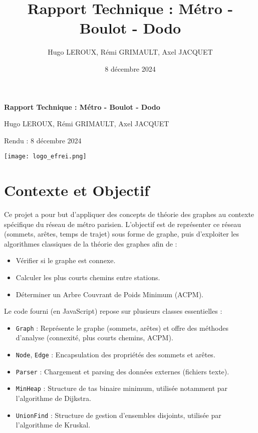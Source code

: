 \documentclass[a4paper,12pt]{article}
\title{Rapport Technique : Métro - Boulot - Dodo}
\author{Hugo LEROUX, Rémi GRIMAULT, Axel JACQUET}
\date{8 décembre 2024}
\begin{document}
\begin{titlepage}
    \thispagestyle{empty} %
    \begin{center}
        \vspace*{\fill}
        {\huge \bfseries Rapport Technique : Métro - Boulot - Dodo\par}
        \vspace{1cm}
        {\Large Hugo LEROUX, Rémi GRIMAULT, Axel JACQUET\par}
        \vspace{0.5cm}
        {\Large Rendu : 8 décembre 2024\par}
        \vspace*{\fill}
    \end{center}
    
    \vspace*{\fill}
    \noindent\texttt{[image: logo\_efrei.png]}\hfill \the{}
    \vspace{0.5cm}
\end{titlepage}

\clearpage
\tableofcontents
\clearpage

\section{Contexte et Objectif}

Ce projet a pour but d'appliquer des concepts de théorie des graphes au contexte spécifique du réseau de métro parisien. L’objectif est de représenter ce réseau (sommets, arêtes, temps de trajet) sous forme de graphe, puis d’exploiter les algorithmes classiques de la théorie des graphes afin de :
\begin{itemize}
    \item Vérifier si le graphe est connexe.
    \item Calculer les plus courts chemins entre stations.
    \item Déterminer un Arbre Couvrant de Poids Minimum (ACPM).
\end{itemize}

Le code fourni (en JavaScript) repose sur plusieurs classes essentielles :
\begin{itemize}
    \item \texttt{Graph} : Représente le graphe (sommets, arêtes) et offre des méthodes d’analyse (connexité, plus courts chemins, ACPM).
    \item \texttt{Node}, \texttt{Edge} : Encapsulation des propriétés des sommets et arêtes.
    \item \texttt{Parser} : Chargement et parsing des données externes (fichiers texte).
    \item \texttt{MinHeap} : Structure de tas binaire minimum, utilisée notamment par l’algorithme de Dijkstra.
    \item \texttt{UnionFind} : Structure de gestion d'ensembles disjoints, utilisée par l’algorithme de Kruskal.
\end{itemize}
\end{document}
